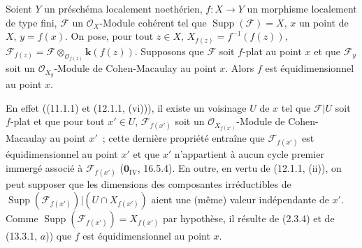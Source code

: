 \begin{proposition}[15.4.1]
\label{IV.15.4.1-fr}
Soient $Y$ un préschéma localement noethérien, $f:X\to Y$ un morphisme localement
de type fini, $\mathcal F$ un $\mathcal O_X$-Module cohérent tel que
$\operatorname{Supp}(\mathcal F)=X$, $x$ un point de $X$, $y=f(x)$. On pose,
pour tout $z\in X$, $X_{f(z)}=f^{-1}(f(z))$,
$\mathcal F_{f(z)}=\mathcal F\otimes_{\mathcal O_{f(z)}}\mathbf{k}(f(z))$.
Supposons que $\mathcal F$ soit $f$-plat au point $x$ et que $\mathcal F_y$ soit
un $\mathcal O_{X_y}$-Module de Cohen-Macaulay au point $x$. Alors $f$ est
équidimensionnel au point $x$.

En effet ((11.1.1) et (12.1.1, (vi))), il existe un voisinage $U$ de $x$ tel que
$\mathcal F|U$ soit $f$-plat et que pour tout $x'\in U$,
$\mathcal F_{f(x')}$ soit un $\mathcal O_{X_{f(x')}}$-Module de Cohen-Macaulay
au point $x'$~; cette dernière propriété entraîne que $\mathcal F_{f(x')}$ est
équidimensionnel au point $x'$ et que $x'$ n'appartient à aucun cycle premier
immergé associé à $\mathcal F_{f(x')}$ ($\mathbf{0}_{\mathrm{IV}}$, 16.5.4). En
outre, en vertu de (12.1.1, (ii)), on peut supposer que les dimensions des
composantes irréductibles de
$\operatorname{Supp}(\mathcal F_{f(x')})|(U\cap X_{f(x')})$ aient une (même)
valeur indépendante de $x'$. Comme
$\operatorname{Supp}(\mathcal F_{f(x')})=X_{f(x')}$ par hypothèse, il résulte de
(2.3.4) et de (13.3.1, $a$)) que $f$ est équidimensionnel au point $x$.
\end{proposition}

